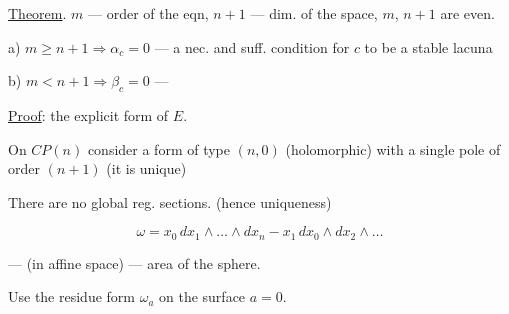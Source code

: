 \underline{Theorem}. $m$ --- order of the eqn, $n+1$ --- dim. of the space, $m$, $n+1$ are even.



a) $m\ge n+1\Rightarrow\alpha_c=0$ --- a nec. and suff. condition for $c$ to be a stable lacuna



b) $m<n+1\Rightarrow\beta_c=0$ ---



\underline{Proof}: the explicit form of $E$.



On $CP (n)$ consider a form of type $(n,0)$ (holomorphic) with a single pole of order $(n+1)$ (it is unique)











There are no global reg. sections. (hence uniqueness)



\begin{equation*}\omega=x_0\, dx_1\wedge\ldots\wedge dx_n-x_1\, dx_0\wedge dx_2\wedge\ldots\end{equation*}



--- (in affine space) --- area of the sphere.





\Needspace{105mm}
Use the residue form $\omega_a$ on the surface $a=0$.



